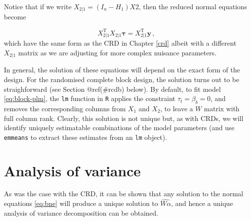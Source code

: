 \documentclass[
]{book}
\newenvironment{Shaded}{\begin{snugshade}}{\end{snugshade}}
\newcommand{\CommentTok}[1]{\textcolor[rgb]{0.56,0.35,0.01}{\textit{#1}}}
\newcommand{\DecValTok}[1]{\textcolor[rgb]{0.00,0.00,0.81}{#1}}
\newcommand{\FunctionTok}[1]{\textcolor[rgb]{0.00,0.00,0.00}{#1}}
\newcommand{\NormalTok}[1]{#1}
\newcommand{\OtherTok}[1]{\textcolor[rgb]{0.56,0.35,0.01}{#1}}
\newcommand{\SpecialCharTok}[1]{\textcolor[rgb]{0.00,0.00,0.00}{#1}}
\theoremstyle{definition}
\theoremstyle{definition}
\theoremstyle{definition}
\theoremstyle{definition}
\theoremstyle{remark}
\begin{document}
\begin{Shaded}
\end{Shaded}

Notice that if we write \(X_{2|1} = (I_n - H_1)X2\), then the reduced normal equations become

\[
X_{2|1}^{\mathrm{T}}X_{2|1}\boldsymbol{\tau} = X_{2|1}^{\mathrm{T}}\boldsymbol{y}\,,
\]
which have the same form as the CRD in Chapter \ref{crd} albeit with a different \(X_{2|1}\) matrix as we are adjusting for more complex nuisance parameters.

In general, the solution of these equations will depend on the exact form of the design. For the randomised complete block design, the solution turns out to be straighforward (see Section @ref(\#rcdb) below). By default, to fit model \eqref{eq:block-plm}, the \texttt{lm} function in \texttt{R} applies the constraint \(\tau_t = \beta_b = 0\), and removes the corresponding columns from \(X_1\) and \(X_2\), to leave a \(W\) matrix with full column rank. Clearly, this solution is not unique but, as with CRDs, we will identify uniquely estimatable combinations of the model parameters (and use \texttt{emmeans} to extract these estimates from an \texttt{lm} object).

\hypertarget{analysis-of-variance}{%
\section{Analysis of variance}\label{analysis-of-variance}}

As was the case with the CRD, it can be shown that any solution to the normal equations \eqref{eq:bne} will produce a unique solution to \(\widehat{W\alpha}\), and hence a unique analysis of variance decomposition can be obtained.
\end{document}

